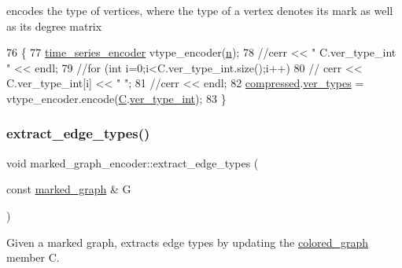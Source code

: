 encodes the type of vertices, where the type of a vertex denotes its mark as well as its degree matrix 


\begin{DoxyCode}
76 \{
77   \hyperlink{classtime__series__encoder}{time\_series\_encoder} vtype\_encoder(\hyperlink{classmarked__graph__encoder_a4c66d9fdbc14c97523715aac7e4511cb}{n});
78   \textcolor{comment}{//cerr << " C.ver\_type\_int " << endl;}
79   \textcolor{comment}{//for (int i=0;i<C.ver\_type\_int.size();i++)}
80   \textcolor{comment}{//  cerr << C.ver\_type\_int[i] << " ";}
81   \textcolor{comment}{//cerr << endl;}
82   \hyperlink{classmarked__graph__encoder_ac2ded200860fdd2321f86dd76b28bcb3}{compressed}.\hyperlink{classmarked__graph__compressed_af446cc5e23c241a92b76642fd5ebc403}{ver\_types} = vtype\_encoder.encode(\hyperlink{classmarked__graph__encoder_af82bc0653414091291cb75553a407bdb}{C}.\hyperlink{classcolored__graph_a491ed2ea1a65118af02ec606c8d44c0a}{ver\_type\_int});
83 \}
\end{DoxyCode}
\mbox{\label{classmarked__graph__encoder_ac3060e8f7e6abbe371c5968eb47cb8a1}} 
\subsubsection{\texorpdfstring{extract\+\_\+edge\+\_\+types()}{extract\_edge\_types()}}
{\footnotesize\ttfamily void marked\+\_\+graph\+\_\+encoder\+::extract\+\_\+edge\+\_\+types (\begin{DoxyParamCaption}\item[{const \hyperlink{classmarked__graph}{marked\+\_\+graph} \&}]{G }\end{DoxyParamCaption})\hspace{0.3cm}{\ttfamily [private]}}



Given a marked graph, extracts edge types by updating the \hyperlink{classcolored__graph}{colored\+\_\+graph} member C. 



